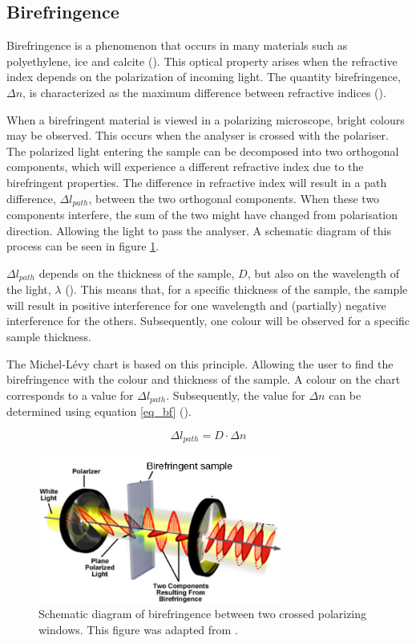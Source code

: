 \subsection{Birefringence}
Birefringence is a phenomenon that occurs in many materials such as polyethylene, ice and calcite (\cite{hecht}). This optical property arises when the refractive index depends on the polarization of incoming light. The quantity birefringence, $\Delta n$, is characterized as the maximum difference between refractive indices (\cite{hecht}).

When a birefringent material is viewed in a polarizing microscope, bright colours may be observed. This occurs when the analyser is crossed with the polariser. The polarized light entering the sample can be decomposed into two orthogonal components, which will experience a different refractive index due to the birefringent properties. The difference in refractive index will result in a path difference, $\Delta l_{path}$, between the two orthogonal components. When these two components interfere, the sum of the two might have changed from polarisation direction. Allowing the light to pass the analyser. A schematic diagram of this process can be seen in figure \ref{fig_bf_diagram}.

$\Delta l_{path}$ depends on the thickness of the sample, $D$, but also on the wavelength of the light, $\lambda$ (\cite{hecht}). This means that, for a specific thickness of the sample, the sample will result in positive interference for one wavelength and (partially) negative interference for the others. Subsequently, one colour will be observed for a specific sample thickness.

The Michel-L\'evy chart is based on this principle. Allowing the user to find the birefringence with the colour and thickness of the sample. A colour on the chart corresponds to a value for $\Delta l_{path}$. Subsequently, the value for $\Delta n$ can be determined using equation \eqref{eq_bf} (\cite{hecht}).  

\begin{equation}
	\label{eq_bf}
	\Delta l_{path} = D \cdot \Delta n
\end{equation}

\begin{figure}[h!]
	\centering
	\includegraphics[width=8cm]{afbeeldingen/bf_principle.png}
	\caption{Schematic diagram of birefringence between two crossed polarizing windows. This figure was adapted from \cite{olympus}.}
	\label{fig_bf_diagram}
\end{figure}
	

